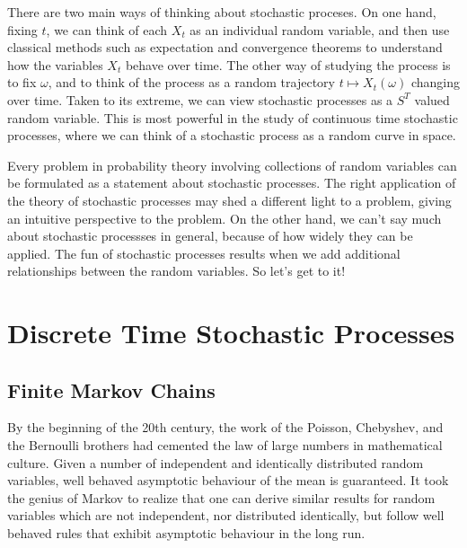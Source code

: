 There are two main ways of thinking about stochastic proceses. On one hand, fixing $t$, we can think of each $X_t$ as an individual random variable, and then use classical methods such as expectation and convergence theorems to understand how the variables $X_t$ behave over time. The other way of studying the process is to fix $\omega$, and to think of the process as a random trajectory $t \mapsto X_t(\omega)$ changing over time. Taken to its extreme, we can view stochastic processes as a $S^T$ valued random variable. This is most powerful in the study of continuous time stochastic processes, where we can think of a stochastic process as a random curve in space.

Every problem in probability theory involving collections of random variables can be formulated as a statement about stochastic processes. The right application of the theory of stochastic processes may shed a different light to a problem, giving an intuitive perspective to the problem. On the other hand, we can't say much about stochastic processses in general, because of how widely they can be applied. The fun of stochastic processes results when we add additional relationships between the random variables. So let's get to it!

\part{Discrete Time Stochastic Processes}

\chapter{Finite Markov Chains}

By the beginning of the 20th century, the work of the Poisson, Chebyshev, and the Bernoulli brothers had cemented the law of large numbers in mathematical culture. Given a number of independent and identically distributed random variables, well behaved asymptotic behaviour of the mean is guaranteed. It took the genius of Markov to realize that one can derive similar results for random variables which are not independent, nor distributed identically, but follow well behaved rules that exhibit asymptotic behaviour in the long run.

